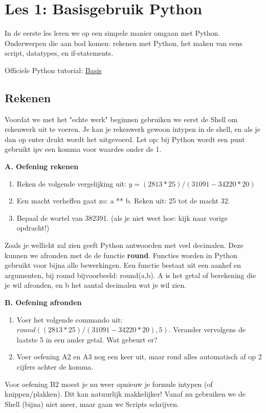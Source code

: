 \chapter{Les 1: Basisgebruik Python}
In de eerste les leren we op een simpele manier omgaan met Python. Onderwerpen die aan bod komen: rekenen met Python, het maken van eens script, datatypes, en if-statements. 

Officiele Python tutorial: \href{https://docs.python.org/3/tutorial/introduction.html}{Basis}

\section{Rekenen}
Voordat we met het "echte werk" beginnen gebruiken we eerst de Shell om rekenwerk uit te voeren. Je kan je rekenwerk gewoon intypen in de shell, en als je dan op enter drukt wordt het uitgevoerd. Let op: bij Python wordt een punt gebruikt ipv een komma voor waardes onder de 1. 

\textbf{A. Oefening rekenen}
\begin{enumerate}[label=\textbf{A.\arabic*}]
\item Reken de volgende vergelijking uit: $y = (2813*25) / (31091-34220*20)$
\item Een macht verheffen gaat zo: a ** b. Reken uit: 25 tot de macht 32. 
\item Bepaal de wortel van 382391. (als je niet weet hoe: kijk naar vorige opdracht!)
\end{enumerate}

Zoals je wellicht zal zien geeft Python antwoorden met veel decimalen. Deze kunnen we afronden met de de functie \textbf{round}. Functies worden in Python gebruikt voor bijna alle bewerkingen. Een functie bestaat uit een aanhef en argumenten, bij round bijvoorbeeld: round(a,b). A is het getal of berekening die je wil afronden, en b het aantal decimalen wat je wil zien. 

\textbf{B. Oefening afronden}
\begin{enumerate}[label=\textbf{B.\arabic*}]
\item Voer het volgende commando uit: $round((2813*25) / (31091-34220*20), 5)$. Verander vervolgens de laatste 5 in een ander getal. Wat gebeurt er?
\item Voer oefening A2 en A3 nog een keer uit, maar rond alles automatisch af op 2 cijfers achter de komma.
\end{enumerate}


Voor oefening B2 moest je nu weer opnieuw je formule intypen (of knippen/plakken). Dit kan natuurlijk makkelijker! Vanaf nu gebruiken we de Shell (bijna) niet meer, maar gaan we Scripts schrijven.


